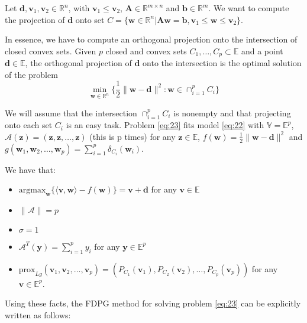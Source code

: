 \documentclass{beamer}
\begin{document}
\begin{frame}


\justifying
Let $\mathbf{d},\mathbf{v}_{1},\mathbf{v}_{2} \in \mathbb{R}^{n}$, with $\mathbf{v}_{1} \leq \mathbf{v}_{2}$, $\mathbf{A} \in \mathbb{R}^{m \times n}$ and $\mathbf{b} \in \mathbb{R}^{m}$. We want to compute the projection of $\mathbf{d}$ onto set $C = \{\mathbf{w} \in \mathbb{R}^{n} | \mathbf{A}\mathbf{w} = \mathbf{b}, \mathbf{v}_{1} \leq \mathbf{w} \leq \mathbf{v}_{2}\}$.

\vspace{0.4cm}
\justifying
In essence, we have to compute an orthogonal projection onto the intersection of closed convex sets. Given $p$ closed and convex sets $C_{1},\dots,C_{p} \subset \mathbb{E}$ and a point $\mathbf{d} \in \mathbb{E}$, the orthogonal projection of $\mathbf{d}$ onto the intersection is the optimal solution of the problem
\begin{equation}
	\label{eq:23}
	\min_{\mathbf{w} \in \mathbb{R}^{n}} \biggl\{ \frac{1}{2} \|\mathbf{w} - \mathbf{d}\|^{2} : \mathbf{w} \in \cap_{i = 1}^{p}C_{i} \biggl\}
\end{equation}

\vspace{0.4cm}
\justifying
We will assume that the intersection $\cap_{i = 1}^{p}C_{i}$ is nonempty and that projecting onto each set $C_{i}$ is an easy task. Problem \eqref{eq:23} fits model \eqref{eq:22} with $\mathbb{V} = \mathbb{E}^{p}$, $\mathcal{A}(\mathbf{z}) = (\mathbf{z}, \mathbf{z}, \dots, \mathbf{z})$ (this is p times) for any $\mathbf{z} \in \mathbb{E}$, $f(\mathbf{w}) = \frac{1}{2} \|\mathbf{w} - \mathbf{d}\|^{2}$ and $g(\mathbf{w}_{1},\mathbf{w}_{2},\dots,\mathbf{w}_{p}) = \sum_{i=1}^{p} \delta_{C_{i}}(\mathbf{w}_{i})$.

\end{frame}





\begin{frame}


\justifying
We have that:
\begin{itemize}
	\item $\text{argmax}_{\mathbf{w}} \{\langle\mathbf{v},\mathbf{w}\rangle - f(\mathbf{w})\} = \mathbf{v} + \mathbf{d}$ for any $\mathbf{v} \in \mathbb{E}$
	\item $\|\mathcal{A}\| = p$
	\item $\sigma = 1$
	\item $\mathcal{A}^{T}(\mathbf{y}) = \sum_{i=1}^{p} y_{i}$ for any $\mathbf{y} \in \mathbb{E}^{p}$
	\item $\text{prox}_{L g}(\mathbf{v}_1,\mathbf{v}_2,\dots,\mathbf{v}_{p}) = (P_{C_1}(\mathbf{v}_{1}), P_{C_2}(\mathbf{v}_{2}), \dots, P_{C_p}(\mathbf{v}_{p}))$ for any $\mathbf{v} \in \mathbb{E}^{p}$.
\end{itemize}

\vspace{0.8cm}
\justifying
Using these facts, the FDPG method for solving problem \eqref{eq:23} can be explicitly written as follows:

\end{frame}
\end{document}
